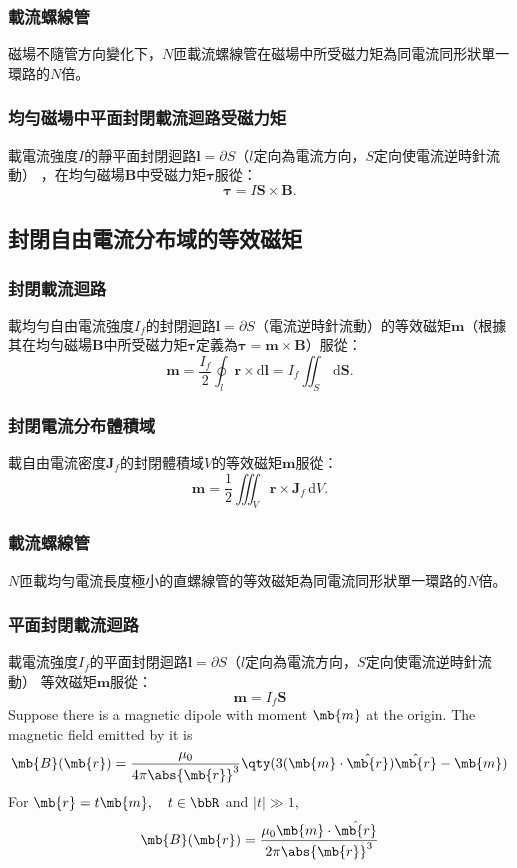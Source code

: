 \documentclass[a4paper,12pt]{report}
\begin{document}
\begin{itemize}
\subsubsection{載流螺線管}
磁場不隨管方向變化下，$N$匝載流螺線管在磁場中所受磁力矩為同電流同形狀單一環路的$N$倍。
\subsubsection{均勻磁場中平面封閉載流迴路受磁力矩}
載電流強度$I$的靜平面封閉迴路$\mathbf{l}=\partial S$（$l$定向為電流方向，$S$定向使電流逆時針流動）  ，在均勻磁場$\mathbf{B}$中受磁力矩$\boldsymbol{\tau}$服從：
\[\boldsymbol{\tau}=I\mathbf{S}\times\mathbf{B}.\]
\subsection{封閉自由電流分布域的等效磁矩}
\subsubsection{封閉載流迴路}
載均勻自由電流強度$I_f$的封閉迴路$\mathbf{l}=\partial S$（電流逆時針流動）的等效磁矩$\mathbf{m}$（根據其在均勻磁場$\mathbf{B}$中所受磁力矩$\boldsymbol{\tau}$定義為$\boldsymbol{\tau}=\mathbf{m}\times\mathbf{B}$）服從：
\[\mathbf{m}=\frac{I_f}{2}\oint_l\mathbf{r}\times\mathrm{d}\mathbf{l}=I_f\iint_S\,\mathrm{d}\mathbf{S}.\]
\subsubsection{封閉電流分布體積域}
載自由電流密度$\mathbf{J}_f$的封閉體積域$V$的等效磁矩$\mathbf{m}$服從：
\[\mathbf{m}=\frac{1}{2}\iiint_V\mathbf{r}\times\mathbf{J}_f\,\mathrm{d}V.\]
\subsubsection{載流螺線管}
$N$匝載均勻電流長度極小的直螺線管的等效磁矩為同電流同形狀單一環路的$N$倍。
\subsubsection{平面封閉載流迴路}
載電流強度$I_f$的平面封閉迴路$\mathbf{l}=\partial S$（$l$定向為電流方向，$S$定向使電流逆時針流動）  等效磁矩$\mathbf{m}$服從：
\[\mathbf{m}=I_f\mathbf{S}\]
Suppose there is a magnetic dipole with moment $\mb{m}$ at the origin. The magnetic field emitted by it is
\[\mb{B}(\mb{r})=\frac{\mu_0}{4\pi\abs{\mb{r}}^3}\qty(3(\mb{m}\cdot\hat{\mb{r}})\hat{\mb{r}}-\mb{m})\]
For $\mb{r}=t\mb{m},\quad t\in\bbR$ and $|t|\gg1$,
\[\mb{B}(\mb{r})=\frac{\mu_0\mb{m}\cdot\hat{\mb{r}}}{2\pi\abs{\mb{r}}^3}\]

\end{itemize}
\end{document}
